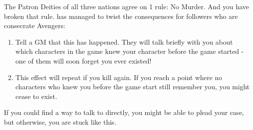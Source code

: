 \documentclass[green]{GL2020}
\begin{document}
\name{\gMurderChup{}}

The Patron Deities of all three nations agree on 1 rule: No Murder. And you have broken that rule. \cGenesis{} has managed to twist the consequences for \cGenesis{\their} followers who are consecrate Avengers:

\begin{enumerate}
  \item Tell a GM that this has happened. They will talk briefly with you about which characters in the game knew your character before the game started - one of them will soon forget you ever existed!
  \item This effect will repeat if you kill again. If you reach a point where no characters who knew you before the game start still remember you, you might cease to exist.
\end{enumerate}

If you could find a way to talk to \cGenesis{} directly, you might be able to plead your case, but otherwise, you are stuck like this.
\end{document}
